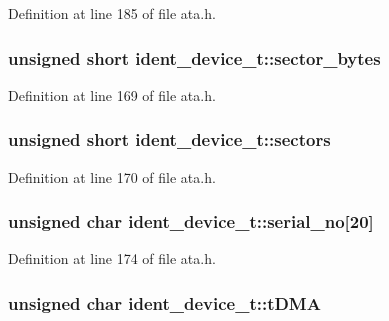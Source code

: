 Definition at line 185 of file ata.\+h.

\subsubsection[{\texorpdfstring{sector\+\_\+bytes}{sector_bytes}}]{\setlength{\rightskip}{0pt plus 5cm}unsigned short ident\+\_\+device\+\_\+t\+::sector\+\_\+bytes}\hypertarget{structident__device__t_a65aac348597065dd666c8d17d5436cfe}{}\label{structident__device__t_a65aac348597065dd666c8d17d5436cfe}


Definition at line 169 of file ata.\+h.

\subsubsection[{\texorpdfstring{sectors}{sectors}}]{\setlength{\rightskip}{0pt plus 5cm}unsigned short ident\+\_\+device\+\_\+t\+::sectors}\hypertarget{structident__device__t_a0936bf38dc570c2117003696aef259ab}{}\label{structident__device__t_a0936bf38dc570c2117003696aef259ab}


Definition at line 170 of file ata.\+h.

\subsubsection[{\texorpdfstring{serial\+\_\+no}{serial_no}}]{\setlength{\rightskip}{0pt plus 5cm}unsigned char ident\+\_\+device\+\_\+t\+::serial\+\_\+no\mbox{[}20\mbox{]}}\hypertarget{structident__device__t_aa2f154afca4db0b73806e565ecf79bfb}{}\label{structident__device__t_aa2f154afca4db0b73806e565ecf79bfb}


Definition at line 174 of file ata.\+h.

\subsubsection[{\texorpdfstring{t\+D\+MA}{tDMA}}]{\setlength{\rightskip}{0pt plus 5cm}unsigned char ident\+\_\+device\+\_\+t\+::t\+D\+MA}\hypertarget{structident__device__t_a06c2602918273e7e0b9163eeb9fa68e3}{}\label{structident__device__t_a06c2602918273e7e0b9163eeb9fa68e3}


